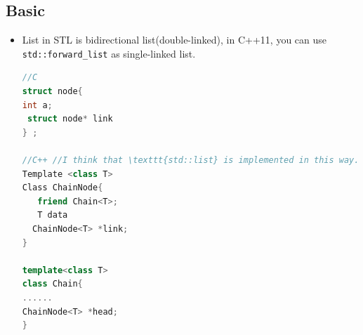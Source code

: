 \documentclass[a4paper,11pt,twoside]{book}
\begin{document}
\subsection{Basic}
\begin{itemize}
\item List in STL is bidirectional list(double-linked), in C++11, you can use \texttt{std::forward\_list} as single-linked list. 

\begin{lstlisting}[frame=single, language=c++]
//C 
struct node{ 
int a; 
 struct node* link
} ;

//C++ //I think that \texttt{std::list} is implemented in this way.
Template <class T>
Class ChainNode{
   friend Chain<T>;
   T data
  ChainNode<T> *link;
}

template<class T>
class Chain{
......
ChainNode<T> *head;
}
\end{lstlisting}

\end{itemize}
\end{document}
